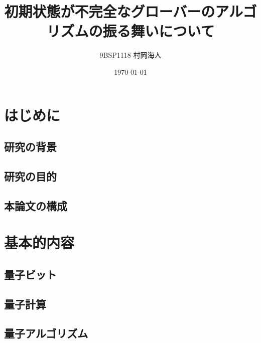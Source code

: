 \documentclass[platex,dvipdfmx, titlepage]{jlreq}			%
\title{初期状態が不完全なグローバーのアルゴリズムの振る舞いについて}
\author{9BSP1118 村岡海人}
\date{\today}
\begin{document}
\maketitle
\section{はじめに}
\subsection{研究の背景}

\subsection{研究の目的}

\subsection{本論文の構成}

\section{基本的内容}
\subsection{量子ビット}

\subsection{量子計算}

\subsection{量子アルゴリズム}



\end{document}
